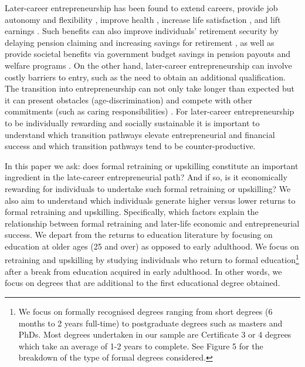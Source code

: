 \documentclass[12pt, a4paper]{article}
\begin{document}
Later-career entrepreneurship has been found to extend careers, provide job autonomy and flexibility \citep{hundley2001}, improve health \citep{stephan2010}, increase life satisfaction \citep{parker2007, kautonen2017, lombard2001}, and lift earnings \citep{levine2017, astebro2014}. Such benefits can also improve individuals’ retirement security by delaying pension claiming and increasing savings for retirement \citep{kibler2012}, as well as provide societal benefits via government budget savings in pension payouts and welfare programs \citep{herneas2016, kautonen2017}. On the other hand, later-career entrepreneurship can involve costly barriers to entry, such as the need to obtain an additional qualification. The transition into entrepreneurship can not only take longer than expected but it can present obstacles (age-discrimination) and compete with other commitments (such as caring responsibilities) \citep{kibler2012, weber2004}. For later-career entrepreneurship to be individually rewarding and socially sustainable it is important to understand which transition pathways elevate entrepreneurial and financial success and which transition pathways tend to be counter-productive.

In this paper we ask: does formal retraining or upskilling constitute an important ingredient in the late-career entrepreneurial path? And if so, is it economically rewarding for individuals to undertake such formal retraining or upskilling? We also aim to understand which individuals generate higher versus lower returns to formal retraining and upskilling. Specifically, which factors explain the relationship between formal retraining and later-life economic and entrepreneurial success. We depart from the returns to education literature by focusing on education at older ages (25 and over) as opposed to early adulthood. We focus on retraining and upskilling by studying individuals who return to formal education\footnote{We focus on formally recognised degrees ranging from short degrees (6 months to 2 years full-time) to postgraduate degrees such as masters and PhDs. Most degrees undertaken in our sample are Certificate 3 or 4 degrees which take an average of 1-2 years to complete. See Figure 5 for the breakdown of the type of formal degrees considered.} after a break from education acquired in early adulthood. In other words, we focus on degrees that are additional to the first educational degree obtained. 
\end{document}
